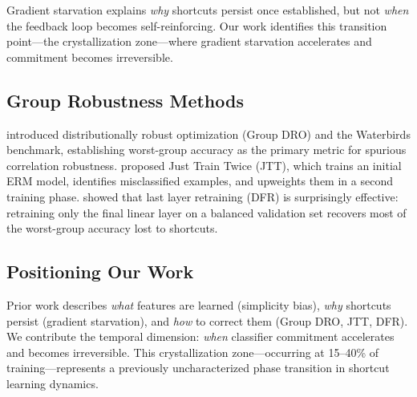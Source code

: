 Gradient starvation explains \emph{why} shortcuts persist once established, but not \emph{when} the feedback loop becomes self-reinforcing. Our work identifies this transition point---the crystallization zone---where gradient starvation accelerates and commitment becomes irreversible.

\subsection{Group Robustness Methods}

\citet{sagawa2020distributionally} introduced distributionally robust optimization (Group DRO) and the Waterbirds benchmark, establishing worst-group accuracy as the primary metric for spurious correlation robustness. \citet{liu2021just} proposed Just Train Twice (JTT), which trains an initial ERM model, identifies misclassified examples, and upweights them in a second training phase. \citet{kirichenko2023last} showed that last layer retraining (DFR) is surprisingly effective: retraining only the final linear layer on a balanced validation set recovers most of the worst-group accuracy lost to shortcuts.

\subsection{Positioning Our Work}

Prior work describes \emph{what} features are learned (simplicity bias), \emph{why} shortcuts persist (gradient starvation), and \emph{how} to correct them (Group DRO, JTT, DFR). We contribute the temporal dimension: \emph{when} classifier commitment accelerates and becomes irreversible. This crystallization zone---occurring at 15--40\% of training---represents a previously uncharacterized phase transition in shortcut learning dynamics.

